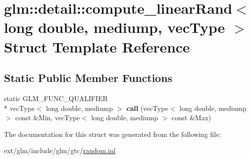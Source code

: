 \hypertarget{structglm_1_1detail_1_1compute__linear_rand_3_01long_01double_00_01mediump_00_01vec_type_01_4}{\section{glm\-:\-:detail\-:\-:compute\-\_\-linear\-Rand$<$ long double, mediump, vec\-Type $>$ Struct Template Reference}
\label{structglm_1_1detail_1_1compute__linear_rand_3_01long_01double_00_01mediump_00_01vec_type_01_4}
}
\subsection*{Static Public Member Functions}
\begin{DoxyCompactItemize}
\item 
\hypertarget{structglm_1_1detail_1_1compute__linear_rand_3_01long_01double_00_01mediump_00_01vec_type_01_4_a80a124d814f09a6892657886e0ae345a}{static G\-L\-M\-\_\-\-F\-U\-N\-C\-\_\-\-Q\-U\-A\-L\-I\-F\-I\-E\-R \\*
vec\-Type$<$ long double, mediump $>$ {\bfseries call} (vec\-Type$<$ long double, mediump $>$ const \&Min, vec\-Type$<$ long double, mediump $>$ const \&Max)}\label{structglm_1_1detail_1_1compute__linear_rand_3_01long_01double_00_01mediump_00_01vec_type_01_4_a80a124d814f09a6892657886e0ae345a}

\end{DoxyCompactItemize}


The documentation for this struct was generated from the following file\-:\begin{DoxyCompactItemize}
\item 
ext/glm/include/glm/gtc/\hyperlink{random_8inl}{random.\-inl}\end{DoxyCompactItemize}
